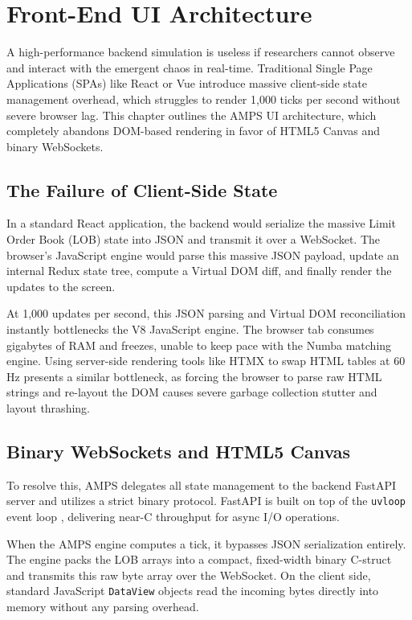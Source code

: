 \chapter{Front-End UI Architecture}
\label{ch:frontend_architecture}

A high-performance backend simulation is useless if researchers cannot observe and interact with the emergent chaos in real-time. Traditional Single Page Applications (SPAs) like React or Vue introduce massive client-side state management overhead, which struggles to render 1,000 ticks per second without severe browser lag. This chapter outlines the AMPS UI architecture, which completely abandons DOM-based rendering in favor of HTML5 Canvas and binary WebSockets.

\section{The Failure of Client-Side State}

In a standard React application, the backend would serialize the massive Limit Order Book (LOB) state into JSON and transmit it over a WebSocket. The browser's JavaScript engine would parse this massive JSON payload, update an internal Redux state tree, compute a Virtual DOM diff, and finally render the updates to the screen. 

At 1,000 updates per second, this JSON parsing and Virtual DOM reconciliation instantly bottlenecks the V8 JavaScript engine. The browser tab consumes gigabytes of RAM and freezes, unable to keep pace with the Numba matching engine. Using server-side rendering tools like HTMX to swap HTML tables at 60 Hz presents a similar bottleneck, as forcing the browser to parse raw HTML strings and re-layout the DOM causes severe garbage collection stutter and layout thrashing.

\section{Binary WebSockets and HTML5 Canvas}

To resolve this, AMPS delegates all state management to the backend FastAPI server and utilizes a strict binary protocol. FastAPI is built on top of the \texttt{uvloop} event loop \cite{selivanov2016uvloop}, delivering near-C throughput for async I/O operations.

When the AMPS engine computes a tick, it bypasses JSON serialization entirely. The engine packs the LOB arrays into a compact, fixed-width binary C-struct and transmits this raw byte array over the WebSocket. On the client side, standard JavaScript \texttt{DataView} objects read the incoming bytes directly into memory without any parsing overhead.


